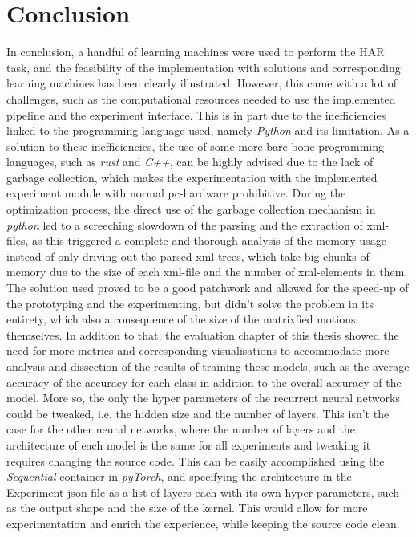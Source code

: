 \chapter{Conclusion}
In conclusion, a handful of learning machines were used to perform the HAR task, and the feasibility of the implementation with solutions and corresponding learning machines has been clearly illustrated. However, this came with a lot of challenges, such as the computational resources needed to use the implemented pipeline and the experiment interface. This is in part due to the inefficiencies linked to the programming language used, namely \textit{Python} and its limitation.\newline
As a solution to these inefficiencies, the use of some more bare-bone programming languages, such as \textit{rust} and \textit{C++}, can be highly advised due to the lack of garbage collection, which makes the experimentation with the implemented experiment module with normal pc-hardware prohibitive. During the optimization process, the direct use of the garbage collection mechanism in \textit{python} led to a screeching slowdown of the parsing and the extraction of xml-files, as this triggered a complete and thorough analysis of the memory usage instead of only driving out the parsed xml-trees, which take big chunks of memory due to the size of each xml-file and the number of xml-elements in them. The solution used proved to be a good patchwork and allowed for the speed-up of the prototyping and the experimenting, but didn't solve the problem in its entirety, which also a consequence of the size of the matrixfied motions themselves.\newline
In addition to that, the evaluation chapter of this thesis showed the need for more metrics and corresponding visualisations to accommodate more analysis and dissection of the results of training these models, such as the average accuracy of the accuracy for each class in addition to the overall accuracy of the model. More so, the only the hyper parameters of the recurrent neural networks could be tweaked, i.e. the hidden size and the number of layers. This isn't the case for the other neural networks, where the number of layers and the architecture of each model is the same for all experiments and tweaking it requires changing the source code. This can be easily accomplished using the \textit{Sequential} container in \textit{pyTorch}, and specifying the architecture in the Experiment json-file as a list of layers each with its own hyper parameters, such as the output shape and the size of the kernel. This would allow for more experimentation and enrich the experience, while keeping the source code clean.\newline
